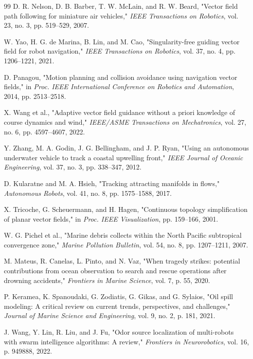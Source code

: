 \documentclass[lettersize,journal]{IEEEtran}
\begin{document}
\begin{thebibliography}{99}
 D. R. Nelson, D. B. Barber, T. W. McLain, and R. W. Beard, "Vector field path following for miniature air vehicles," \textit{IEEE Transactions on Robotics}, vol. 23, no. 3, pp. 519--529, 2007.

 W. Yao, H. G. de Marina, B. Lin, and M. Cao, "Singularity-free guiding vector field for robot navigation," \textit{IEEE Transactions on Robotics}, vol. 37, no. 4, pp. 1206--1221, 2021.

 D. Panagou, "Motion planning and collision avoidance using navigation vector fields," in \textit{Proc. IEEE International Conference on Robotics and Automation}, 2014, pp. 2513--2518.

 X. Wang et al., "Adaptive vector field guidance without a priori knowledge of course dynamics and wind," \textit{IEEE/ASME Transactions on Mechatronics}, vol. 27, no. 6, pp. 4597--4607, 2022.

 Y. Zhang, M. A. Godin, J. G. Bellingham, and J. P. Ryan, "Using an autonomous underwater vehicle to track a coastal upwelling front," \textit{IEEE Journal of Oceanic Engineering}, vol. 37, no. 3, pp. 338--347, 2012.

 D. Kularatne and M. A. Hsieh, "Tracking attracting manifolds in flows," \textit{Autonomous Robots}, vol. 41, no. 8, pp. 1575--1588, 2017.

 X. Tricoche, G. Scheuermann, and H. Hagen, "Continuous topology simplification of planar vector fields," in \textit{Proc. IEEE Visualization}, pp. 159--166, 2001.

 W. G. Pichel et al., "Marine debris collects within the North Pacific subtropical convergence zone," \textit{Marine Pollution Bulletin}, vol. 54, no. 8, pp. 1207--1211, 2007.

 M. Mateus, R. Canelas, L. Pinto, and N. Vaz, "When tragedy strikes: potential contributions from ocean observation to search and rescue operations after drowning accidents," \textit{Frontiers in Marine Science}, vol. 7, p. 55, 2020.

 P. Keramea, K. Spanoudaki, G. Zodiatis, G. Gikas, and G. Sylaios, "Oil spill modeling: A critical review on current trends, perspectives, and challenges," \textit{Journal of Marine Science and Engineering}, vol. 9, no. 2, p. 181, 2021.

 J. Wang, Y. Lin, R. Liu, and J. Fu, "Odor source localization of multi-robots with swarm intelligence algorithms: A review," \textit{Frontiers in Neurorobotics}, vol. 16, p. 949888, 2022.


\end{thebibliography}
\end{document}

